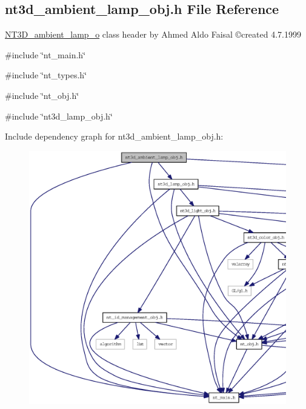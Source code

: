 \subsection{nt3d\_\-ambient\_\-lamp\_\-obj.h File Reference}
\label{nt3d__ambient__lamp__obj_8h}



\begin{DoxyItemize}
\item \hyperlink{class_n_t3_d__ambient__lamp__o}{NT3D\_\-ambient\_\-lamp\_\-o} class header by Ahmed Aldo Faisal \copyright created 4.7.1999 
\end{DoxyItemize} 


{\ttfamily \#include \char`\"{}nt\_\-main.h\char`\"{}}\par
{\ttfamily \#include \char`\"{}nt\_\-types.h\char`\"{}}\par
{\ttfamily \#include \char`\"{}nt\_\-obj.h\char`\"{}}\par
{\ttfamily \#include \char`\"{}nt3d\_\-lamp\_\-obj.h\char`\"{}}\par
Include dependency graph for nt3d\_\-ambient\_\-lamp\_\-obj.h:
\nopagebreak
\begin{figure}[H]
\begin{center}
\leavevmode
\includegraphics[width=400pt]{nt3d__ambient__lamp__obj_8h__incl}
\end{center}
\end{figure}
